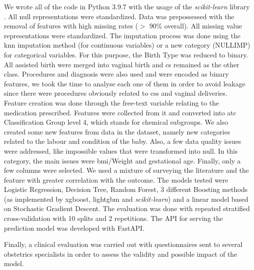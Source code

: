 We wrote all of the code in Python 3.9.7 with the usage of the \textit{scikit-learn} library \cite{scikit-learn}. All null representations were standardized. Data was prepossessed with the removal of features with high missing rates ($>$ 90\% overall). All missing value representations were standardized. The imputation process was done using the \ac{knn} imputation method (for continuous variables) or a new category (NULLIMP) for categorical variables. 
For this purpose, the Birth Type was reduced to binary. All assisted birth were merged into vaginal birth and \ac{cs} remained as the other class. Procedures and diagnosis were also used and were encoded as binary features, we took the time to analyse each one of them in order to avoid leakage since there were procedures obviously related to \acp{cs} and vaginal deliveries.
Feature creation was done through the free-text variable relating to the medication prescribed. Features were collected from it and converted into \ac{atc} Classification Group level 4, which stands for chemical subgroups. We also created some new features from data in the dataset, namely new categories related to the labour and condition of the baby.
Also, a few data quality issues were addressed, like impossible values that were transformed into null. In this category, the main issues were \ac{bmi}/Weight and gestational age.
Finally, only a few columns were selected. We used a mixture of surveying the literature and the feature with greater correlation with the outcome.
The models tested were Logistic Regression, Decision Tree, Random Forest, 3 different Boosting methods (as implemented by \ac{xgboost}, \ac{lightgbm} and \textit{scikit-learn}) and a linear model based on Stochastic Gradient Descent.
The evaluation was done with repeated stratified cross-validation with 10 splits and 2 repetitions.
The API for serving the prediction model was developed with FastAPI.

Finally, a clinical evaluation was carried out with questionnaires sent to several obstetrics specialists in order to assess the validity and possible impact of the model.
